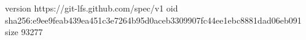 version https://git-lfs.github.com/spec/v1
oid sha256:e9ee9feab439ea451c3e7264b95d0aceb3309907fc44ee1ebc8881dad06eb091
size 93277
